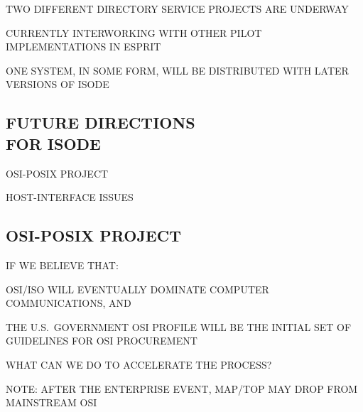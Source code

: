 \begin{bwslide}

\begin{nrtc}
\item	TWO DIFFERENT DIRECTORY SERVICE PROJECTS ARE UNDERWAY
    \begin{nrtc}
    \item	CURRENTLY INTERWORKING WITH OTHER PILOT IMPLEMENTATIONS
		IN ESPRIT
    \end{nrtc}

\item	ONE SYSTEM, IN SOME FORM, WILL BE DISTRIBUTED WITH LATER VERSIONS
	OF ISODE
\end{nrtc}
\end{bwslide}


\begin{bwslide}
\part	{FUTURE DIRECTIONS\\ FOR ISODE}\bf

\begin{nrtc}
\item	OSI-POSIX PROJECT

\item	HOST-INTERFACE ISSUES
\end{nrtc}
\end{bwslide}


\begin{bwslide}
\part*	{OSI-POSIX PROJECT}\bf

\begin{nrtc}
\item	IF WE BELIEVE THAT:
    \begin{nrtc}
    \item	OSI/ISO WILL EVENTUALLY DOMINATE COMPUTER COMMUNICATIONS, AND

    \item	THE U.S.~GOVERNMENT OSI PROFILE WILL BE THE INITIAL SET OF
		GUIDELINES FOR OSI PROCUREMENT
    \end{nrtc}

\item	WHAT CAN WE DO TO ACCELERATE THE PROCESS?

\item	NOTE: AFTER THE ENTERPRISE EVENT, MAP/TOP MAY DROP FROM 
	MAINSTREAM OSI
\end{nrtc}
\end{bwslide}



